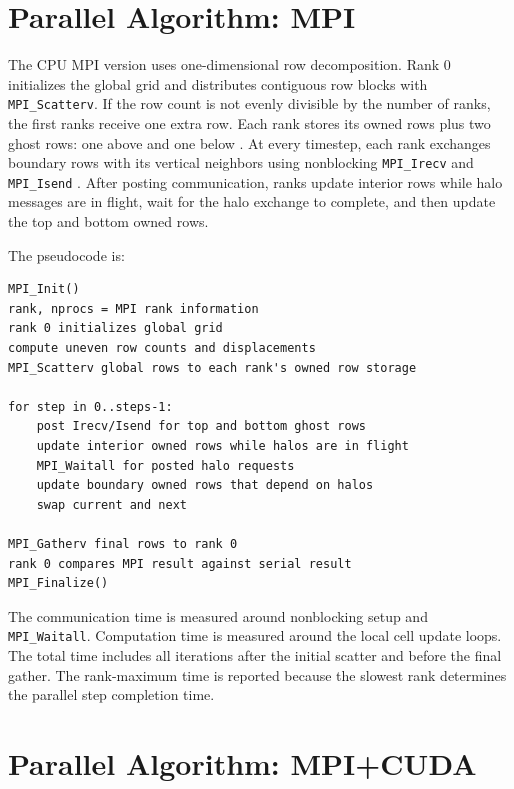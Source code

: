 \documentclass[10pt,twocolumn]{article}
\begin{document}
\section*{Parallel Algorithm: MPI}

The CPU MPI version uses one-dimensional row decomposition. Rank 0 initializes the global grid and distributes contiguous row blocks with \texttt{MPI\_Scatterv}. If the row count is not evenly divisible by the number of ranks, the first ranks receive one extra row. Each rank stores its owned rows plus two ghost rows: one above and one below \cite{halo}. At every timestep, each rank exchanges boundary rows with its vertical neighbors using nonblocking \texttt{MPI\_Irecv} and \texttt{MPI\_Isend} \cite{mpi41, llnlmpi}. After posting communication, ranks update interior rows while halo messages are in flight, wait for the halo exchange to complete, and then update the top and bottom owned rows.

The pseudocode is:

\begin{center}
\begin{minipage}{0.85\linewidth}
\begin{lstlisting}[frame=single]
MPI_Init()
rank, nprocs = MPI rank information
rank 0 initializes global grid
compute uneven row counts and displacements
MPI_Scatterv global rows to each rank's owned row storage

for step in 0..steps-1:
    post Irecv/Isend for top and bottom ghost rows
    update interior owned rows while halos are in flight
    MPI_Waitall for posted halo requests
    update boundary owned rows that depend on halos
    swap current and next

MPI_Gatherv final rows to rank 0
rank 0 compares MPI result against serial result
MPI_Finalize()
\end{lstlisting}
\end{minipage}
\end{center}

The communication time is measured around nonblocking setup and \texttt{MPI\_Waitall}. Computation time is measured around the local cell update loops. The total time includes all iterations after the initial scatter and before the final gather. The rank-maximum time is reported because the slowest rank determines the parallel step completion time.

\section*{Parallel Algorithm: MPI+CUDA}
\end{document}
